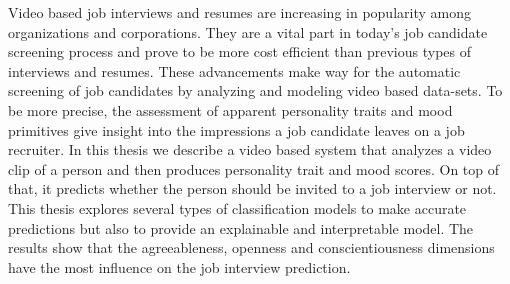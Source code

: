 Video based job interviews and resumes are increasing in popularity among organizations and corporations. They are a vital part in today's job candidate screening process and prove to be more cost efficient than previous types of interviews and resumes. These advancements make way for the automatic screening of job candidates by analyzing and modeling video based data-sets. To be more precise, the assessment of apparent personality traits and mood primitives give insight into the impressions a job candidate leaves on a job recruiter. In this thesis we describe a video based system that analyzes a video clip of a person and then produces personality trait and mood scores. On top of that, it predicts whether the person should be invited to a job interview or not. This thesis explores several types of classification models to make accurate predictions but also to provide an explainable and interpretable model. The results show that the agreeableness, openness and conscientiousness dimensions have the most influence on the job interview prediction.

